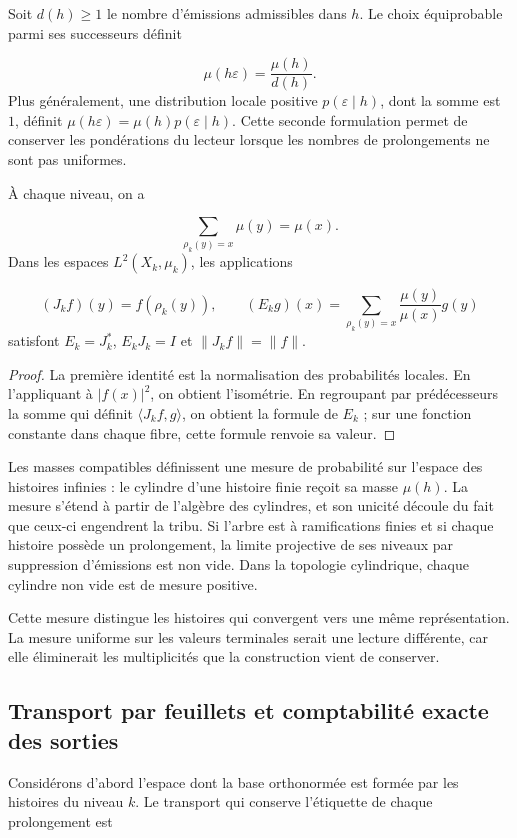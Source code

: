 Soit \(d(h)\geq1\) le nombre d’émissions admissibles dans \(h\). Le choix équiprobable parmi ses successeurs définit

\[
\mu(h\varepsilon)=\frac{\mu(h)}{d(h)}.
\]
Plus généralement, une distribution locale positive \(p(\varepsilon\mid h)\), dont la somme est \(1\), définit \(\mu(h\varepsilon)=\mu(h)p(\varepsilon\mid h)\). Cette seconde formulation permet de conserver les pondérations du lecteur lorsque les nombres de prolongements ne sont pas uniformes.

\begin{proposition}
\label{iv:cont:esperanza}
À chaque niveau, on a

\[
\sum_{\rho_k(y)=x}\mu(y)=\mu(x).
\]
Dans les espaces \(L^2(X_k,\mu_k)\), les applications

\[
(J_kf)(y)=f(\rho_k(y)),
\qquad
(E_kg)(x)=\sum_{\rho_k(y)=x}\frac{\mu(y)}{\mu(x)}g(y)
\]
satisfont \(E_k=J_k^*\), \(E_kJ_k=I\) et \(\|J_kf\|=\|f\|\).

\end{proposition}
\begin{proof}
La première identité est la normalisation des probabilités locales. En l’appliquant à \(|f(x)|^2\), on obtient l’isométrie. En regroupant par prédécesseurs la somme qui définit \(\langle J_kf,g\rangle\), on obtient la formule de \(E_k\) ; sur une fonction constante dans chaque fibre, cette formule renvoie sa valeur.
\end{proof}

Les masses compatibles définissent une mesure de probabilité sur l’espace des histoires infinies : le cylindre d’une histoire finie reçoit sa masse \(\mu(h)\). La mesure s’étend à partir de l’algèbre des cylindres, et son unicité découle du fait que ceux-ci engendrent la tribu. Si l’arbre est à ramifications finies et si chaque histoire possède un prolongement, la limite projective de ses niveaux par suppression d’émissions est non vide. Dans la topologie cylindrique, chaque cylindre non vide est de mesure positive.

Cette mesure distingue les histoires qui convergent vers une même représentation. La mesure uniforme sur les valeurs terminales serait une lecture différente, car elle éliminerait les multiplicités que la construction vient de conserver.

\subsection{Transport par feuillets et comptabilité exacte des sorties}
\label{iv:cont:transporte}
Considérons d’abord l’espace dont la base orthonormée est formée par les histoires du niveau \(k\). Le transport qui conserve l’étiquette de chaque prolongement est

